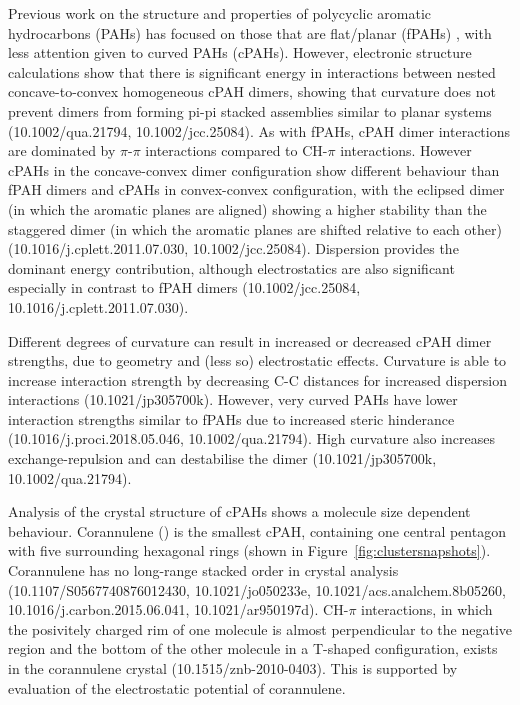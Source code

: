 
Previous work on the structure and properties of polycyclic aromatic hydrocarbons (PAHs) has focused on those that are flat/planar (fPAHs) \cite{Grancic2016,chen2014size} %
, with less attention given to curved PAHs (cPAHs). However, electronic structure calculations show that there is significant energy in interactions between nested concave-to-convex homogeneous cPAH dimers, showing that curvature does not prevent dimers from forming pi-pi stacked assemblies similar to planar systems (10.1002/qua.21794, 10.1002/jcc.25084). As with fPAHs, cPAH dimer interactions are dominated by $\pi$-$\pi$ interactions compared to CH-$\pi$ interactions. However cPAHs in the concave-convex dimer configuration show different behaviour than fPAH dimers and cPAHs in convex-convex configuration, with the eclipsed dimer (in which the aromatic planes are aligned) showing a higher stability than the staggered dimer (in which the aromatic planes are shifted relative to each other) (10.1016/j.cplett.2011.07.030, 10.1002/jcc.25084).
Dispersion provides the dominant energy contribution, although electrostatics are also significant especially in contrast to fPAH dimers (10.1002/jcc.25084, 10.1016/j.cplett.2011.07.030). 

Different degrees of curvature can result in increased or decreased cPAH dimer strengths, due to geometry and (less so) electrostatic effects. Curvature is able to increase interaction strength by decreasing C-C distances for increased dispersion interactions (10.1021/jp305700k). 
However, very curved PAHs have lower interaction strengths similar to fPAHs due to increased steric hinderance (10.1016/j.proci.2018.05.046, 10.1002/qua.21794). High curvature also increases exchange-repulsion and can destabilise the dimer (10.1021/jp305700k, 10.1002/qua.21794).


Analysis of the crystal structure of cPAHs shows a molecule size dependent behaviour. Corannulene () is the smallest cPAH, containing one central pentagon with five surrounding hexagonal rings (shown in Figure~\ref{fig:clustersnapshots}). Corannulene has no long-range stacked order in crystal analysis (10.1107/S0567740876012430, 10.1021/jo050233e, 10.1021/acs.analchem.8b05260, 10.1016/j.carbon.2015.06.041, 10.1021/ar950197d). 
CH-$\pi$ interactions, in which the posivitely charged rim of one molecule is almost perpendicular to the negative region and the bottom of the other molecule in a T-shaped configuration, exists in the corannulene crystal (10.1515/znb-2010-0403). This is supported by evaluation of the electrostatic potential of corannulene.

